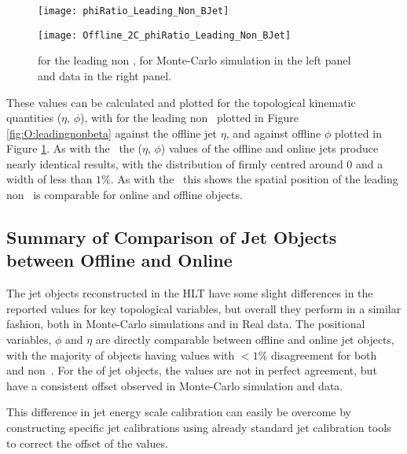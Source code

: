 	\begin{figure}[h]
		\centering
		\begin{minipage}[h]{0.47\linewidth}
			\texttt{[image: phiRatio\_Leading\_Non\_BJet]}

		\end{minipage}
		\begin{minipage}[h]{0.47\linewidth}
			\texttt{[image: Offline\_2C\_phiRatio\_Leading\_Non\_BJet]}
		\end{minipage}
		\caption{\dphph for the leading non \bjet, for Monte-Carlo simulation in the left panel and data in the right panel.}
		\label{fig:O:leadingnonbphi}
	\end{figure}

	These \dxx values can be calculated and plotted for the topological kinematic quantities ($\eta$, $\phi$), with \dee for the leading non \bjet\ plotted in Figure \ref{fig:O:leadingnonbeta} against the offline jet $\eta$, and \dphph against offline $\phi$ plotted in Figure \ref{fig:O:leadingnonbphi}. As with the \bjets\, the ($\eta$, $\phi$) values of the offline and online jets produce nearly identical results, with the distribution of \dxx firmly centred around 0 and a width of less than $1\%$. As with the \bjets\ this shows the spatial position of the leading non \bjet\ is comparable for online and offline objects.


	\subsection{Summary of Comparison of Jet Objects between Offline and Online}

		The jet objects reconstructed in the HLT have some slight differences in the reported values for key topological variables, but overall they perform in a similar fashion, both in Monte-Carlo simulations and in Real data. The positional variables, $\phi$ and $\eta$ are directly comparable between offline and online jet objects, with the majority of objects having values with $<1\%$ disagreement for both \bjets\, and non \bjets\,. For the \pt of jet objects, the values are not in perfect agreement, but have a consistent offset observed in Monte-Carlo simulation and data.

		This difference in jet energy scale calibration can easily be overcome by constructing specific jet calibrations using already  standard jet calibration tools \cite{JES, jetcalib} to correct the offset of the \pt values.

